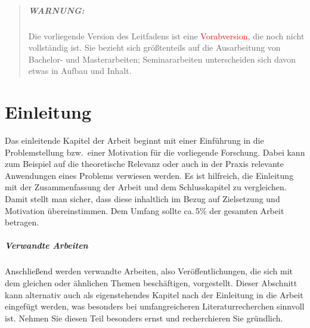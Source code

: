 \documentclass[bachelor,german]{info1thesis}
\begin{document}
\begin{abstract}
    \paragraph{WARNUNG:} 
    Die vorliegende Version des Leitfadens ist eine \textcolor{red}{Vorabversion}, die noch nicht vollständig ist.
    Sie bezieht sich größtenteils auf die Ausarbeitung von Bachelor- und Masterarbeiten; Seminararbeiten unterscheiden sich davon etwas in Aufbau und Inhalt.

\end{abstract}

\thesistableofcontents











\chapter{Einleitung}
Das einleitende Kapitel der Arbeit beginnt mit einer Einführung in die Problemstellung bzw.\ einer Motivation für die vorliegende Forschung.
Dabei kann zum Beispiel auf die theoretische Relevanz oder auch in der Praxis relevante Anwendungen eines Problems verwiesen werden.
Es ist hilfreich, die Einleitung mit der Zusammenfassung der Arbeit und dem Schlusskapitel zu vergleichen. 
Damit stellt man sicher, dass diese inhaltlich im Bezug auf Zielsetzung und Motivation übereinstimmen. Dem Umfang sollte ca.\,5\% der gesamten Arbeit betragen.

\paragraph{Verwandte Arbeiten}
Anschließend werden verwandte Arbeiten, also Veröffentlichungen, die sich mit dem gleichen oder ähnlichen Themen beschäftigen, vorgestellt.
Dieser Abschnitt kann alternativ auch als eigenstehendes Kapitel nach der Einleitung in die Arbeit eingefügt werden, was besonders bei umfangreicheren Literaturrecherchen sinnvoll ist.
Nehmen Sie diesen Teil besonders ernst und recherchieren Sie gründlich.
\end{document}
